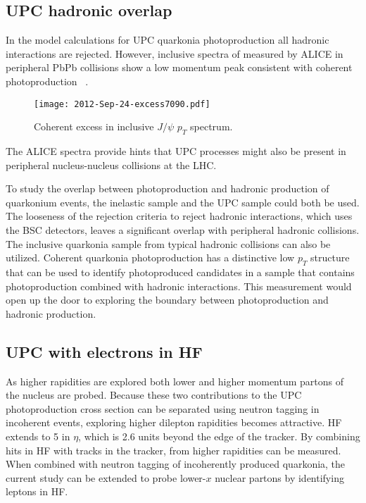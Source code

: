     \subsection{UPC hadronic overlap}
      In the model calculations for UPC quarkonia 
        photoproduction all hadronic interactions are rejected.
      However, inclusive \pt{} spectra of \JPsi{} measured by ALICE in 
        peripheral PbPb collisions show a low momentum peak consistent with 
        coherent photoproduction ~\cite{aliceIclJpsi}.
      \begin{figure}[h]
        \centering
        \texttt{[image: 2012-Sep-24-excess7090.pdf]}
        \caption{Coherent excess in inclusive $J/\psi$ $p_{T}$ spectrum.}
        \label{fig:alicePtSpecLowPt}
      \end{figure}
      The ALICE spectra provide hints that UPC processes might also be present 
        in peripheral nucleus-nucleus collisions at the LHC.
      
      To study the overlap between photoproduction and hadronic production of 
        quarkonium events, the inelastic sample and the UPC sample could both be
        used. 
      The looseness of the rejection criteria to reject hadronic interactions,
        which uses the BSC detectors, leaves a significant overlap with 
        peripheral hadronic collisions. 
      The inclusive quarkonia sample from typical hadronic collisions can also 
        be utilized. 
      Coherent quarkonia photoproduction has a distinctive low $p_{T}$ structure
        that can be used to identify photoproduced candidates in a sample that 
        contains photoproduction combined with hadronic interactions.
      This measurement would open up the door to exploring the boundary between
        photoproduction and hadronic production.

    \subsection{UPC \JPsi{} with electrons in HF}
      As higher rapidities are explored both lower and higher momentum partons
        of the nucleus are probed. 
      Because these two contributions to the UPC photoproduction cross section 
        can be separated using neutron tagging in incoherent events, exploring
        higher dilepton rapidities becomes attractive.
      HF extends to 5 in $\eta$, which is 2.6 units beyond the edge of the 
        tracker.
      By combining hits in HF with tracks in the tracker,  
        \JPsi{} from higher rapidities can be measured. 
      When combined with neutron tagging of incoherently produced quarkonia,
        the current study can be extended to probe lower-$x$ nuclear partons 
        by identifying leptons in HF. 

